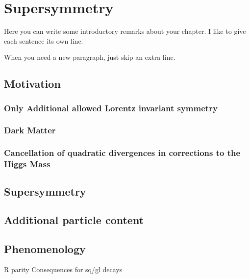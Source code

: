 

\chapter[Supersymmetry][Top of Page Title]{Supersymmetry}

Here you can write some introductory remarks about your chapter.
I like to give each sentence its own line.

When you need a new paragraph, just skip an extra line.

\section{Motivation}

\subsection{Only Additional allowed Lorentz invariant symmetry}
\subsection{Dark Matter}
\subsection{Cancellation of quadratic divergences in corrections to the Higgs Mass}

\section{Supersymmetry}

\section{Additional particle content}

\section{Phenomenology}

R parity
Consequences for sq/gl decays

